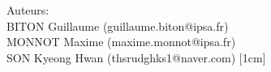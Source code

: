 \begin{titlepage}
{\normalsize Auteurs:}\\
\small
BITON Guillaume \small(guillaume.biton@ipsa.fr)\\
MONNOT Maxime \small(maxime.monnot@ipsa.fr)\\
SON Kyeong Hwan \small(thsrudghks1@naver.com) [1cm]

 

\vfill %

\restoregeometry

\end{titlepage}